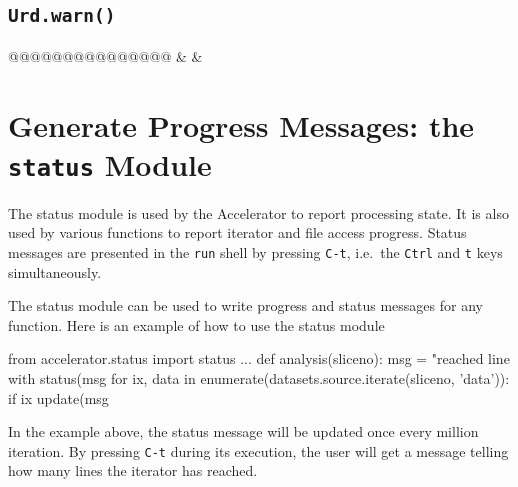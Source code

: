 \subsection{\texttt{Urd.warn()}}
\begin{leftbar}
@@@@@@@@@@@@@@@
\starttable
\texttt{} & \texttt{} & \\
\stoptable
\end{leftbar}




\section{Generate Progress Messages:  the \texttt{status} Module}

The status module is used by the Accelerator to report processing
state.  It is also used by various functions to report iterator and
file access progress.  Status messages are presented in
the \texttt{run} shell by pressing \texttt{C-t}, i.e.\
the \texttt{Ctrl} and \texttt{t} keys simultaneously.

The status module can be used to write progress and status messages
for any function.  Here is an example of how to use the status module
\begin{python}
from accelerator.status import status
...
def analysis(sliceno):
    msg = "reached line %
    with status(msg %
        for ix, data in enumerate(datasets.source.iterate(sliceno, 'data')):
            if ix %
                update(msg %
\end{python}
In the example above, the status message will be updated once every
million iteration.  By pressing \texttt{C-t} during its execution, the
user will get a message telling how many lines the iterator has
reached.








